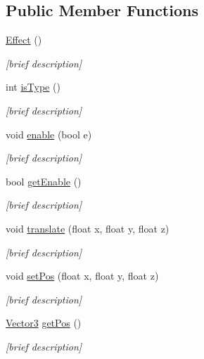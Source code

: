 \subsection*{Public Member Functions}
\begin{DoxyCompactItemize}
\item 
\hyperlink{class_effect_a4dae74244f59936a49847da9217b4126}{Effect} ()
\begin{DoxyCompactList}\small\item\em \mbox{[}brief description\mbox{]} \end{DoxyCompactList}\item 
int \hyperlink{class_effect_a341dbd8ed4d921f21e041ad4c49f3ca5}{is\-Type} ()
\begin{DoxyCompactList}\small\item\em \mbox{[}brief description\mbox{]} \end{DoxyCompactList}\item 
void \hyperlink{class_effect_a8eef7dc5e13869286937eac91b6b4e82}{enable} (bool e)
\begin{DoxyCompactList}\small\item\em \mbox{[}brief description\mbox{]} \end{DoxyCompactList}\item 
bool \hyperlink{class_effect_a646edbd991706c9229ea1a87587a3ba3}{get\-Enable} ()
\begin{DoxyCompactList}\small\item\em \mbox{[}brief description\mbox{]} \end{DoxyCompactList}\item 
void \hyperlink{class_effect_a90509b57fed454734360a7bdad9e4441}{translate} (float x, float y, float z)
\begin{DoxyCompactList}\small\item\em \mbox{[}brief description\mbox{]} \end{DoxyCompactList}\item 
void \hyperlink{class_effect_a03da2911589ef11254c6ffd7ed0ca0ae}{set\-Pos} (float x, float y, float z)
\begin{DoxyCompactList}\small\item\em \mbox{[}brief description\mbox{]} \end{DoxyCompactList}\item 
\hyperlink{struct_vector3}{Vector3} \hyperlink{class_effect_a3439e1bf3ca53c04c408b94a5e62ceba}{get\-Pos} ()
\begin{DoxyCompactList}\small\item\em \mbox{[}brief description\mbox{]} \end{DoxyCompactList}\item 

\end{DoxyCompactItemize}
